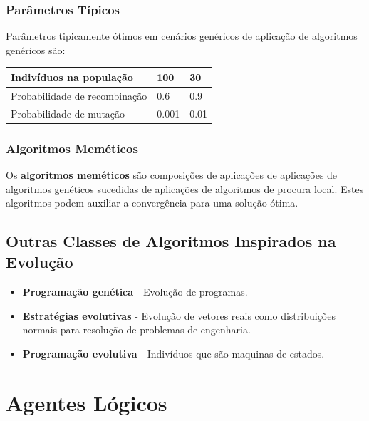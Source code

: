 \documentclass[]{report}
\begin{document}
\subsection{Parâmetros Típicos}
Parâmetros tipicamente ótimos em cenários genéricos de aplicação de algoritmos genéricos são:
\begin{table}[ht]
	\begin{tabular}{l|l|l}
		\textbf{Indivíduos na população}& \textbf{100}	& \textbf{30}   \\\hline
		Probabilidade de recombinação 	& 0.6			& 0.9  \\\hline
		Probabilidade de mutação      	& 0.001			& 0.01
	\end{tabular}
\end{table}
\subsection{Algoritmos Meméticos}
Os \textbf{algoritmos meméticos} são composições de aplicações de aplicações de algoritmos genéticos sucedidas de aplicações de algoritmos de procura local.
Estes algoritmos podem auxiliar a convergência para uma solução ótima.
\section{Outras Classes de Algoritmos Inspirados na Evolução}
\begin{itemize}
	\item \textbf{Programação genética} - Evolução de programas.
	\item \textbf{Estratégias evolutivas} - Evolução de vetores reais como distribuições normais para resolução de problemas de engenharia.
	\item \textbf{Programação evolutiva} - Indivíduos que são maquinas de estados.
\end{itemize}
\chapter{Agentes Lógicos}
\end{document}
